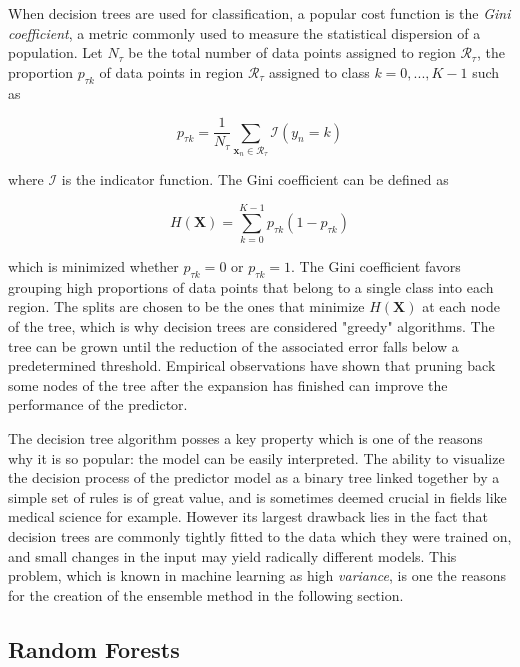 \documentclass{kththesis}
\begin{document}
When decision trees are used for classification, a popular cost function is the \emph{Gini coefficient}, a metric commonly used to measure the statistical dispersion of a population. Let $N_\tau$ be the total number of data points assigned to region $\mathcal{R}_\tau$,  the proportion $p_{\tau k}$ of data points in region $\mathcal{R}_\tau$ assigned to class $k = 0,...,K-1$ such as 

\begin{equation}
p_{\tau k} = \frac{1}{N_\tau} \sum_{\mathbf{x}_n \in \mathcal{R}_\tau} \mathcal{I}(y_n = k)
\end{equation}
 
 where $\mathcal{I}$ is the indicator function. The Gini coefficient can be defined as 
 
 \begin{equation}
 H(\mathbf{X}) = \sum_{k=0}^{K-1} p_{\tau k} (1-p_{\tau k})
 \end{equation}
 
which is minimized whether $p_{\tau k}=0$ or $p_{\tau k}=1$. The Gini coefficient favors grouping high proportions of data points that belong to a single class into each region. The splits are chosen to be the ones that minimize $H(\mathbf{X})$ at each node of the tree, which is why decision trees are considered "greedy" algorithms. The tree can be grown until the reduction of the associated error falls below a predetermined threshold. Empirical observations have shown that pruning back some nodes of the tree after the expansion has finished can improve the performance of the predictor.
 
The decision tree algorithm posses a key property which is one of the reasons why it is so popular: the model can be easily interpreted. The ability to visualize the decision process of the predictor model as a binary tree linked together by a simple set of rules is of great value, and is sometimes deemed crucial in fields like medical science for example. However its largest drawback lies in the fact that decision trees are commonly tightly fitted to the data which they were trained on, and small changes in the input may yield radically different models. This problem, which is known in machine learning as high \emph{variance}, is one the reasons for the creation of the ensemble method in the following section.
 
\subsection{Random Forests}
\end{document}
